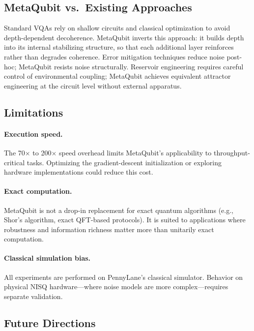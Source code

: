 \documentclass[twocolumn,amsmath,amssymb,prl]{revtex4-2}
\begin{document}
\subsection{MetaQubit vs.\ Existing Approaches}

Standard VQAs rely on shallow circuits and classical optimization to avoid
depth-dependent decoherence.  MetaQubit inverts this approach: it builds
depth into its internal stabilizing structure, so that each additional layer
reinforces rather than degrades coherence.  Error mitigation techniques reduce
noise post-hoc; MetaQubit resists noise structurally.  Reservoir engineering
requires careful control of environmental coupling; MetaQubit achieves
equivalent attractor engineering at the circuit level without external
apparatus.

\subsection{Limitations}

\paragraph{Execution speed.}  The 70$\times$ to 200$\times$ speed overhead
limits MetaQubit's applicability to throughput-critical tasks.  Optimizing
the gradient-descent initialization or exploring hardware implementations
could reduce this cost.

\paragraph{Exact computation.}  MetaQubit is not a drop-in replacement for
exact quantum algorithms (e.g., Shor's algorithm, exact QFT-based protocols).
It is suited to applications where robustness and information richness matter
more than unitarily exact computation.

\paragraph{Classical simulation bias.}  All experiments are performed on
PennyLane's classical simulator.  Behavior on physical NISQ hardware—where
noise models are more complex—requires separate validation.

\subsection{Future Directions}
\end{document}
